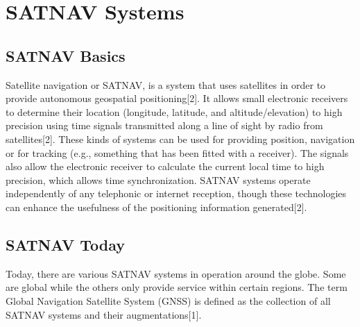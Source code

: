 \documentclass[conference]{IEEEtran}
\begin{document}
\section{SATNAV Systems}

\subsection{SATNAV Basics}

Satellite navigation or SATNAV, is a system that uses satellites in order to provide autonomous geospatial positioning[2]. It allows small electronic receivers to determine their location (longitude, latitude, and altitude/elevation) to high precision using time signals transmitted along a line of sight by radio from satellites[2]. These kinds of systems can be used for providing position, navigation or for tracking (e.g., something that has been fitted with a receiver). The signals also allow the electronic receiver to calculate the current local time to high precision, which allows time synchronization. SATNAV systems operate independently of any telephonic or internet reception, though these technologies can enhance the usefulness of the positioning information generated[2].

\subsection{SATNAV Today}

Today, there are various SATNAV systems in operation around the globe. Some are global while the others only provide service within certain regions. The term Global Navigation Satellite System (GNSS) is defined as the collection of all SATNAV systems and their augmentations[1].
\end{document}
